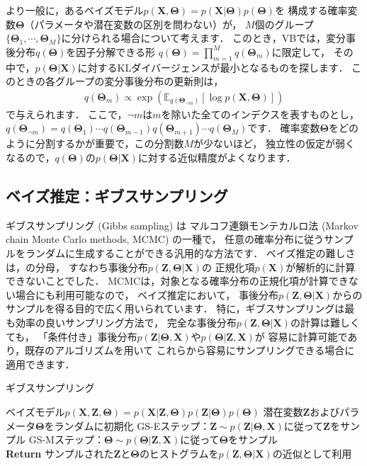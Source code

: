 より一般に，あるベイズモデル$p(\bm{X},\bm\Theta)=p(\bm{X}|\bm\Theta)p(\bm\Theta)$を
構成する確率変数$\bm\Theta$（パラメータや潜在変数の区別を問わない）が，
$M$個のグループ$\{\bm\Theta_1,\cdots,\bm\Theta_M\}$に分けられる場合について考えます．
このとき，VBでは，変分事後分布$q(\bm\Theta)$を因子分解できる形
$q(\bm\Theta) = \prod_{m=1}^M q(\bm\Theta_m)$に限定して，
その中で，$p(\bm\Theta|\bm{X})$に対するKLダイバージェンスが最小となるものを探します．
このときの各グループの変分事後分布の更新則は，
\begin{align}
q(\bm\Theta_m) 
\propto 
\exp\left(
\mathbb{E}_{q(\bm\Theta_{\neg m})}
\left[\log p(\bm{X},\bm\Theta)\right]
\right)
\end{align}
で与えられます．
ここで，$\neg m$は$m$を除いた全てのインデクスを表すものとし，
$q(\bm\Theta_{\neg m}) = q(\bm\Theta_1) \cdots q(\bm\Theta_{m-1}) q(\bm\Theta_{m+1}) \cdots q(\bm\Theta_M)$です．
確率変数$\bm\Theta$をどのように分割するかが重要で，この分割数$M$が少ないほど，
独立性の仮定が弱くなるので，$q(\bm\Theta)$の$p(\bm\Theta|\bm{X})$に対する近似精度がよくなります．

\subsection{ベイズ推定：ギブスサンプリング}
\label{sec:mcmc}

ギブスサンプリング (Gibbs sampling) は
マルコフ連鎖モンテカルロ法 (Markov chain Monte Carlo methods, MCMC) の一種で，
任意の確率分布に従うサンプルをランダムに生成することができる汎用的な方法です．
ベイズ推定の難しさは，の分母，
すなわち事後分布$p(\bm{Z},\bm\Theta|\bm{X})$の
正規化項$p(\bm{X})$が解析的に計算できないことでした．
MCMCは，対象となる確率分布の正規化項が計算できない場合にも利用可能なので，
ベイズ推定において，
事後分布$p(\bm{Z},\bm\Theta|\bm{X})$からのサンプルを得る目的で広く用いられています．
特に，ギブスサンプリングは最も効率の良いサンプリング方法で，
完全な事後分布$p(\bm{Z},\bm\Theta|\bm{X})$の計算は難しくても，
「条件付き」事後分布$p(\bm{Z}|\bm\Theta,\bm{X})$や$p(\bm\Theta|\bm{Z},\bm{X})$が
容易に計算可能であり，既存のアルゴリズムを用いて
これらから容易にサンプリングできる場合に適用できます．

\begin{algobox}{ギブスサンプリング}
\label{algo:gs}
\begin{algorithmic}[1]
\Require ベイズモデル$p(\bm{X},\bm{Z},\bm\Theta) = p(\bm{X}|\bm{Z},\bm\Theta) p(\bm{Z} | \bm\Theta) p(\bm\Theta)$
\State 潜在変数$\bm{Z}$およびパラメータ$\bm\Theta$をランダムに初期化
\State GS-Eステップ：$\bm{Z} \sim p(\bm{Z} | \bm\Theta, \bm{X})$に従って$\bm{Z}$をサンプル
\State GS-Mステップ：$\bm\Theta \sim p(\bm\Theta | \bm{Z}, \bm{X})$に従って$\bm\Theta$をサンプル
\EndWhile\\
{\bf Return} サンプルされた$\bm{Z}$と$\bm\Theta$のヒストグラムを$p(\bm{Z}, \bm\Theta | \bm{X})$の近似として利用
\end{algorithmic}
\end{algobox}

